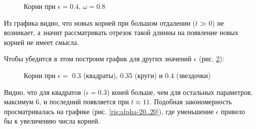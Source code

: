\documentclass[%
bachelor,    %
natbib,      %
subf,        %
href,        %
colorlinks,  %
]{disser}
\begin{document}
\begin{figure}[h]
	\caption{Корни при $\epsilon = 0.4$, $\omega = 0.8$}
	\label{ris:roots1}
\end{figure}

Из графика видно, что новых корней при большом отдалении ($t\gg0$) не возникает, а значит рассматривать отрезок такой длинны на появление новых корней не имеет смысла.

Чтобы убедится в этом построим график для других значений $\epsilon$ (рис. \ref{ris:roots2}):

\begin{figure}[h]
	\caption{Корни при $\epsilon = $ 0.3 (квадраты), 0.35 (круги) и 0.4 (звездочки) }
	\label{ris:roots2}
\end{figure}

Видно, что для квадратов ($\epsilon = 0.3$) коней больше, чем для остальных параметров, максимум 6, и последний появляется при $t \approx 11$. Подобная закономерность просматривалась на графике (рис. \ref{ris:alpha-20..20}), где уменьшение $\epsilon$ привело бы к увеличению числа корней.
\end{document}

